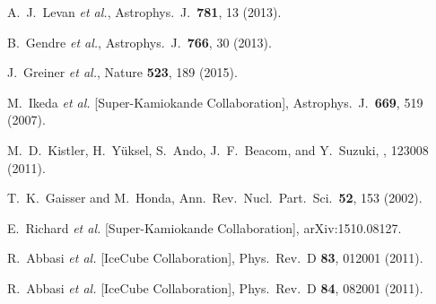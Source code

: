 \documentclass[aps,prd,nofootinbib,twocolumn,floatfix,letterpaper,superscriptaddress,showpacs]{revtex4}
\begin{document}
\begin{thebibliography}{99}
  A.~J.~Levan {\it et al.},
  Astrophys.\ J.\  {\bf 781}, 13 (2013).

  B.~Gendre {\it et al.},
  Astrophys.\ J.\  {\bf 766}, 30 (2013).

  J.~Greiner {\it et al.},
  Nature {\bf 523}, 189 (2015).



  M.~Ikeda {\it et al.} [Super-Kamiokande Collaboration],
  Astrophys.\ J.\  {\bf 669}, 519 (2007).

  M.~D.\ Kistler, H.\ Y{\"u}ksel, S.\ Ando, J.~F.\ Beacom, and Y.\ Suzuki,
  , 123008 (2011).


  T.~K.~Gaisser and M.~Honda,
  Ann.\ Rev.\ Nucl.\ Part.\ Sci.\  {\bf 52}, 153 (2002).

  E.~Richard {\it et al.} [Super-Kamiokande Collaboration],
  arXiv:1510.08127.

  R.~Abbasi {\it et al.} [IceCube Collaboration],
  Phys.\ Rev.\ D {\bf 83}, 012001 (2011).

  R.~Abbasi {\it et al.} [IceCube Collaboration],
  Phys.\ Rev.\ D {\bf 84}, 082001 (2011).


\end{thebibliography}
\end{document}
